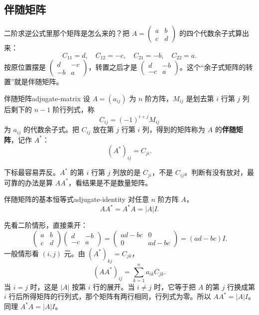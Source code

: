 \subsection{伴随矩阵}

二阶求逆公式里那个矩阵是怎么来的？把 \(A=\begin{pmatrix}a&b\\c&d\end{pmatrix}\) 的四个代数余子式算出来：
\[
C_{11}=d,\quad C_{12}=-c,\quad C_{21}=-b,\quad C_{22}=a.
\]
按原位置摆是 \(\begin{pmatrix}d&-c\\-b&a\end{pmatrix}\)，转置之后才是 \(\begin{pmatrix}d&-b\\-c&a\end{pmatrix}\)。这个“余子式矩阵的转置”就是伴随矩阵。

\begin{mydef}{伴随矩阵}{adjugate-matrix}
设 \(A=(a_{ij})\) 为 \(n\) 阶方阵，\(M_{ij}\) 是划去第 \(i\) 行第 \(j\) 列后剩下的 \(n-1\) 阶行列式，称
\[
C_{ij}=(-1)^{i+j}M_{ij}
\]
为 \(a_{ij}\) 的代数余子式。把 \(C_{ij}\) 放在第 \(j\) 行第 \(i\) 列，得到的矩阵称为 \(A\) 的\textbf{伴随矩阵}，记作 \(A^*\)：
\[
(A^*)_{ij}=C_{ji}.
\]
\end{mydef}

下标最容易弄反。\(A^*\) 的第 \(i\) 行第 \(j\) 列放的是 \(C_{ji}\)，不是 \(C_{ij}\)。判断有没有放对，最可靠的办法是算 \(AA^*\)，看结果是不是数量矩阵。

\begin{conclusion}{伴随矩阵的基本恒等式}{adjugate-identity}
对任意 \(n\) 阶方阵 \(A\)，
\[
AA^*=A^*A=|A|I.
\]
\end{conclusion}

先看二阶情形，直接乘开：
\[
\begin{pmatrix}a&b\\c&d\end{pmatrix}
\begin{pmatrix}d&-b\\-c&a\end{pmatrix}
=\begin{pmatrix}ad-bc&0\\0&ad-bc\end{pmatrix}
=(ad-bc)I.
\]
一般情形看 \((i,j)\) 元。由 \((A^*)_{kj}=C_{jk}\)，
\[
(AA^*)_{ij}=\sum_{k=1}^{n}a_{ik}C_{jk}.
\]
当 \(i=j\) 时，这是 \(|A|\) 按第 \(i\) 行的展开。当 \(i\neq j\) 时，它等于把 \(A\) 的第 \(j\) 行换成第 \(i\) 行后所得矩阵的行列式，那个矩阵有两行相同，行列式为零。所以 \(AA^*=|A|I\)。同理 \(A^*A=|A|I\)。

